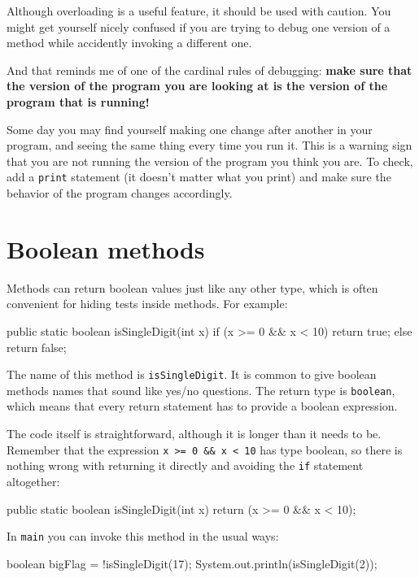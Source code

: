 Although overloading is a useful feature, it should be used
with caution.  You might get yourself nicely confused if you
are trying to debug one version of a method while accidently
invoking a different one.

And that reminds me of one of the cardinal rules of
debugging: {\bf make sure that the version of the program
you are looking at is the version of the program that is running!}

Some day you may find yourself making one change after another
in your program, and seeing the same thing every time you run it.
This is a warning sign that you are
not running the version of the program you think you are.  To
check, add a {\tt print} statement (it doesn't matter what
you print) and make sure the behavior of the program changes
accordingly.


\section{Boolean methods}
\label{boolean}

Methods can return boolean values just like any other type,
which is often convenient for hiding tests inside
methods.  For example:

\begin{code}
  public static boolean isSingleDigit(int x) {
    if (x >= 0 && x < 10) {
      return true;
    } else {
      return false;
    }
  }
\end{code}

The name of this method is {\tt isSingleDigit}.  It is common
to give boolean methods names that sound like yes/no questions.
The return type is {\tt boolean}, which means that every return
statement has to provide a boolean expression.

The code itself is straightforward, although it is longer than
it needs to be.  Remember that the expression {\tt x >= 0 \&\& x < 10}
has type boolean, so there is nothing wrong with returning it
directly and avoiding the {\tt if} statement altogether:

\begin{code}
  public static boolean isSingleDigit(int x) {
    return (x >= 0 && x < 10);
  }
\end{code}

In {\tt main} you can invoke this method in the usual ways:

\begin{code}
  boolean bigFlag = !isSingleDigit(17);
  System.out.println(isSingleDigit(2));
\end{code}


